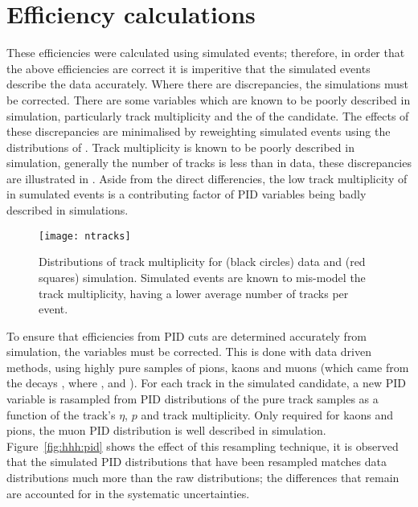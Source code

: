 \section{Efficiency calculations}


These efficiencies were calculated using simulated events; therefore, in order that the above
efficiencies are correct it is imperitive that the simulated events describe the data accurately.
Where there are discrepancies, the simulations must be corrected.
There are some variables which are known to be poorly described in simulation, particularly track
multiplicity and the \chisqvtx of the \Bp candidate.
The effects of these discrepancies are minimalised by reweighting simulated events using
the distributions of \btojpsikpipi.
Track multiplicity is known to be poorly described in simulation, generally the number of tracks is
less than in data, these discrepancies are illustrated in .
Aside from the direct differencies, the low track multiplicity of in sumulated events is a
contributing factor of PID variables being badly described in simulations.

\begin{figure}
  \begin{center}
    \texttt{[image: ntracks]}
    \caption{\small
      Distributions of track multiplicity for (black circles) data and (red squares) simulation.
      Simulated events are known to mis-model the track multiplicity, having a lower average number
      of tracks per event.
    }
    \label{fig:hhh:ntracks}
  \end{center}
\end{figure}

To ensure that efficiencies from PID cuts are determined accurately from simulation, the variables
must be corrected.
This is done with data driven methods, using highly pure samples of pions, kaons
and muons (which came from the decays \decay{\Dstarp}{\Dz\pip}, where \decay{\Dz}{\Km\pip}, and
\jpsitomumu).
For each track in the simulated \Bp candidate, a new PID variable is rasampled from PID
distributions of the pure track samples as a function of the track's $\eta$, $p$ and track
multiplicity.
Only required for kaons and pions, the muon PID distribution is well described in simulation.
Figure~\ref{fig:hhh:pid} shows the effect of this resampling technique, it is observed that the
simulated PID distributions that have been resampled matches data distributions much more than the
raw distributions; the differences that remain are accounted for in the systematic uncertainties.


